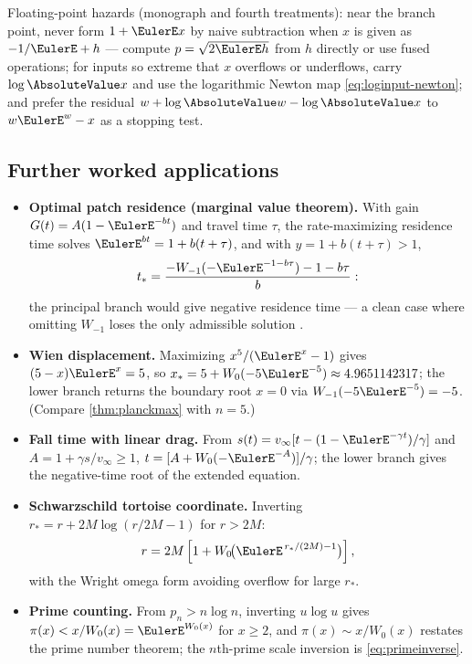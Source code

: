 \documentclass[11pt]{article}
\theoremstyle{remark}
\begin{document}
Floating-point hazards (monograph and fourth treatments): near the branch
point, never form \(1+\EulerE x\) by naive subtraction when \(x\) is given as
\(-1/\EulerE+h\) --- compute \(p=\sqrt{2\EulerE h}\) from \(h\) directly or use
fused operations; for inputs so extreme that \(x\) overflows or underflows,
carry \(\log\AbsoluteValue x\) and use the logarithmic Newton map
\eqref{eq:loginput-newton}; and prefer the residual
\(w+\log\AbsoluteValue w-\log\AbsoluteValue x\) to \(w\EulerE^w-x\) as a stopping test.

\subsection{Further worked applications}

\begin{itemize}
\item\textbf{Optimal patch residence (marginal value theorem).}  With gain
\(G(t)=A(1-\EulerE^{-bt})\) and travel time \(\tau\), the rate-maximizing
residence time solves \(\EulerE^{bt}=1+b(t+\tau)\), and with \(y=1+b(t+\tau)>1\),
\begin{equation}\label{cmp:eq:patch}
 t_*=\frac{-W_{-1}(-\EulerE^{-1-b\tau})-1-b\tau}{b}:
\end{equation}
the principal branch would give negative residence time --- a clean case
where omitting \(W_{-1}\) loses the only admissible solution
\cite{lehtonen2016}.
\item\textbf{Wien displacement.}  Maximizing \(x^5/(\EulerE^x-1)\) gives
\((5-x)\EulerE^x=5\), so \(x_*=5+W_0(-5\EulerE^{-5})\approx4.9651142317\); the
lower branch returns the boundary root \(x=0\) via
\(W_{-1}(-5\EulerE^{-5})=-5\).  (Compare \cref{thm:planckmax} with \(n=5\).)
\item\textbf{Fall time with linear drag.}  From
\(s(t)=v_\infty[t-(1-\EulerE^{-\gamma t})/\gamma]\) and
\(A=1+\gamma s/v_\infty\ge1\),
\(t=[A+W_0(-\EulerE^{-A})]/\gamma\); the lower branch gives the negative-time
root of the extended equation.
\item\textbf{Schwarzschild tortoise coordinate.}  Inverting
\(r_*=r+2M\log(r/2M-1)\) for \(r>2M\):
\begin{equation}\label{cmp:eq:tortoise}
 r=2M\left[1+W_0\!\bigl(\EulerE^{\,r_*/(2M)-1}\bigr)\right],
\end{equation}
with the Wright omega form avoiding overflow for large \(r_*\).
\item\textbf{Prime counting.}  From \(p_n>n\log n\), inverting
\(u\log u\) gives
\(\pi(x)<x/W_0(x)=\EulerE^{W_0(x)}\) for \(x\ge2\), and
\(\pi(x)\sim x/W_0(x)\) restates the prime number theorem; the \(n\)th-prime
scale inversion is \eqref{eq:primeinverse}.
\end{itemize}
\end{document}
